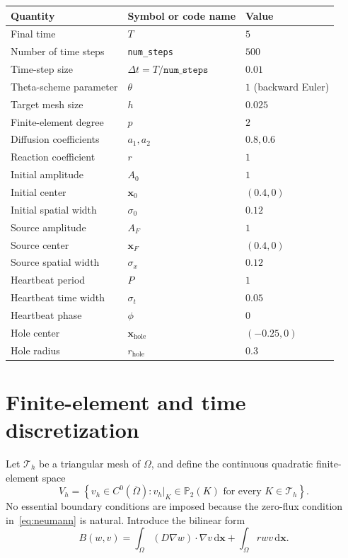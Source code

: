 \documentclass[11pt]{article}
\newcommand{\dd}{\,\mathrm{d}}
\begin{document}
\begin{center}
\begin{tabular}{@{}lll@{}}
\toprule
Quantity & Symbol or code name & Value \\
\midrule
Final time & \(T\) & \(5\) \\
Number of time steps & \texttt{num\_steps} & \(500\) \\
Time-step size & \(\Delta t=T/\texttt{num\_steps}\) & \(0.01\) \\
Theta-scheme parameter & \(\theta\) & \(1\) (backward Euler) \\
Target mesh size & \(h\) & \(0.025\) \\
Finite-element degree & \(p\) & \(2\) \\
Diffusion coefficients & \(a_1,a_2\) & \(0.8,0.6\) \\
Reaction coefficient & \(r\) & \(1\) \\
Initial amplitude & \(A_0\) & \(1\) \\
Initial center & \(\boldsymbol{x}_0\) & \((0.4,0)\) \\
Initial spatial width & \(\sigma_0\) & \(0.12\) \\
Source amplitude & \(A_F\) & \(1\) \\
Source center & \(\boldsymbol{x}_F\) & \((0.4,0)\) \\
Source spatial width & \(\sigma_x\) & \(0.12\) \\
Heartbeat period & \(P\) & \(1\) \\
Heartbeat time width & \(\sigma_t\) & \(0.05\) \\
Heartbeat phase & \(\phi\) & \(0\) \\
Hole center & \(\boldsymbol{x}_{\mathrm{hole}}\) & \((-0.25,0)\) \\
Hole radius & \(r_{\mathrm{hole}}\) & \(0.3\) \\
\bottomrule
\end{tabular}
\end{center}

\section{Finite-element and time discretization}

Let \(\mathcal{T}_h\) be a triangular mesh of \(\Omega\), and define the
continuous quadratic finite-element space
\begin{equation}
  V_h
  = \left\{v_h\in C^0(\overline{\Omega}):
      v_h|_K\in\mathbb{P}_2(K)
      \text{ for every }K\in\mathcal{T}_h\right\}.
\end{equation}
No essential boundary conditions are imposed because the zero-flux condition
in~\eqref{eq:neumann} is natural.  Introduce the bilinear form
\begin{equation}
  B(w,v)
  = \int_\Omega (D\nabla w)\cdot\nabla v\dd\boldsymbol{x}
    + \int_\Omega r wv\dd\boldsymbol{x}.
\end{equation}
\end{document}
